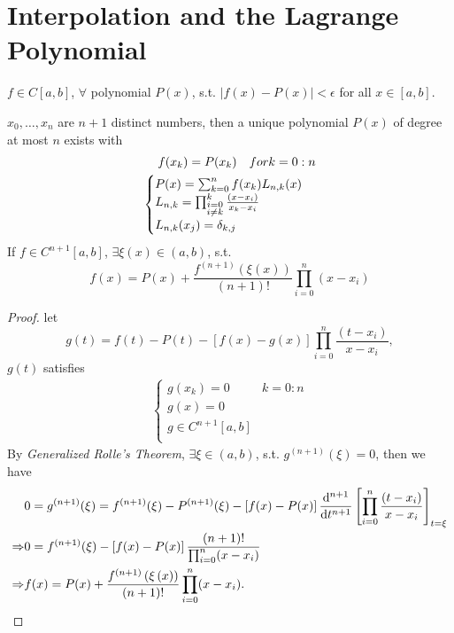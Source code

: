 \section{Interpolation and the Lagrange Polynomial}

\begin{theo}
$f\in C[a,b]$, $\forall$ polynomial $P(x)$, s.t. $\left|f(x)-P(x)\right|<\epsilon$ for all $x\in [a,b]$.
\end{theo}

\begin{theo}
$x_0,\ldots,x_n$ are $n+1$ distinct numbers, then a unique polynomial $P(x)$ of degree at most $n$ exists with
\begin{align*}
  f(x_k)=P(x_k)\quad for\space k=0:n \\
  \begin{cases}
    P(x)=\sum_{k=0}^{n}f(x_k)L_{n,k}(x) \\
    L_{n,k}=\prod_{\substack{i=0\\i\neq k}}^{k}\frac{(x-x_i)}{x_k-x_i} \\
    L_{n,k}(x_j)=\delta_{k,j}
  \end{cases}
\end{align*}
If $f\in C^{n+1}[a,b]$, $\exists\xi(x)\in (a,b)$, s.t.
\[
f(x) = P(x) + \frac{f^{(n+1)}\left(\xi\left(x\right)\right)}{(n+1)!}\prod_{i=0}^{n}(x-x_i)
\]
\end{theo}

\begin{proof}
let \[g(t)=f(t)-P(t)-\left[f(x)-g(x)\right]\prod_{i=0}^{n}\frac{(t-x_i)}{x-x_i},\]
$g(t)$ satisfies
\begin{align*}
  \begin{cases}
  g(x_k)=0 & k=0:n\\
  g(x)=0 & \\
  g\in C^{n+1}[a,b] \\
  \end{cases}
\end{align*}
By \emph{Generalized Rolle's Theorem}, $\exists\xi\in (a,b)$, s.t. $g^{(n+1)}(\xi)=0$, then we have
\begin{align*}
& 0 = g^{(n+1)}(\xi)=f^{(n+1)}(\xi)-P^{(n+1)}(\xi)-\left[f(x)-P(x)\right]\frac{\mathrm{d}^{n+1}}{\mathrm{d} t^{n+1}}\left[\prod_{i=0}^{n}\frac{(t-x_i)}{x-x_i}\right]_{t=\xi} \\
\Rightarrow & 0 = f^{(n+1)}(\xi)-\left[f(x)-P(x)\right]\frac{(n+1)!}{\prod_{i=0}^{n}(x-x_i)} \\
\Rightarrow & f(x) = P(x) + \frac{f^{(n+1)}\left(\xi\left(x\right)\right)}{(n+1)!}\prod_{i=0}^{n}(x-x_i).
\end{align*}
\end{proof} 